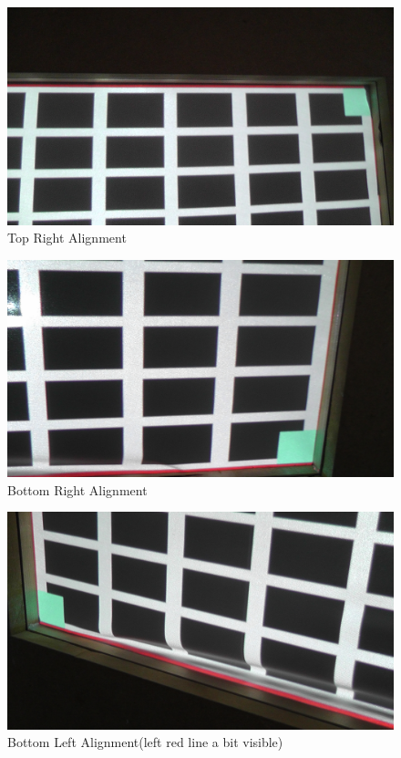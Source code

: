 \documentclass[]{article}
\begin{document}
\begin{appendices}
 \begin{figure}[!hbtp]
    \centering
    \includegraphics[width=1.0\linewidth]{figures/TopRight.JPG} 
    \caption{Top Right Alignment} 
    \label{fig:TRA-big} 
  \end{figure}
  
  \begin{figure}[!hbtp]
     \centering
     \includegraphics[width=1.0\linewidth]{figures/BottomRight.JPG} 
     \caption{Bottom Right Alignment} 
     \label{fig:BRA-big} 
  \end{figure}
  
  \begin{figure}[!hbtp]
     \centering
     \includegraphics[width=1.0\linewidth]{figures/BottomLeft2.JPG} 
     \caption{Bottom Left Alignment(left red line a bit visible)} 
     \label{fig:BLA-big} 
   \end{figure}
\clearpage{\pagestyle{empty}\cleardoublepage}

\end{appendices}
\end{document}
